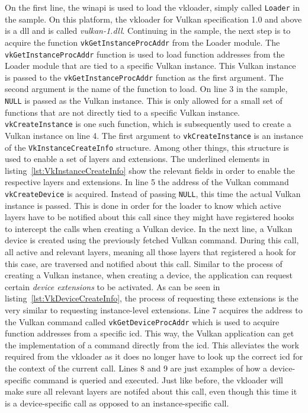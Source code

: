     On the first line, the \gls{winapi} is used to load the \gls{vkloader}, simply called \lstinline{Loader} in the sample. On this platform, the \gls{vkloader} for Vulkan specification 1.0 and above is a \gls{dll} and is called \textit{vulkan-1.dll}. Continuing in the sample, the next step is to acquire the function \lstinline{vkGetInstanceProcAddr} from the Loader module. The \lstinline{vkGetInstanceProcAddr} function is used to load function addresses from the Loader module that are tied to a specific Vulkan instance. This Vulkan instance is passed to the \lstinline{vkGetInstanceProcAddr} function as the first argument. The second argument is the name of the function to load. On line 3 in the sample, \lstinline{NULL} is passed as the Vulkan instance. This is only allowed for a small set of functions that are not directly tied to a specific Vulkan instance. \lstinline{vkCreateInstance} is one such function, which is subsequently used to create a Vulkan instance on line 4. The first argument to \lstinline{vkCreateInstance} is an instance of the \lstinline{VkInstanceCreateInfo} structure. Among other things, this structure is used to enable a set of layers and extensions. The underlined elements in listing~\ref{lst:VkInstanceCreateInfo} show the relevant fields in order to enable the respective layers and extensions. In line 5 the address of the Vulkan command \lstinline{vkCreateDevice} is acquired. Instead of passing \lstinline{NULL}, this time the actual Vulkan instance is passed. This is done in order for the loader to know which active layers have to be notified about this call since they might have registered hooks to intercept the calls when creating a Vulkan device. In the next line, a Vulkan device is created using the previously fetched Vulkan command. During this call, all active and relevant layers, meaning all those layers that registered a hook for this case, are traversed and notified about this call. Similar to the process of creating a Vulkan instance, when creating a device, the application can request certain \textit{device extensions} to be activated. As can be seen in listing~\ref{lst:VkDeviceCreateInfo}, the process of requesting these extensions is the very similar to requesting instance-level extensions. Line 7 acquires the address to the Vulkan command called \lstinline{vkGetDeviceProcAddr} which is used to acquire function addresses from a specific \gls{icd}. This way, the Vulkan application can get the implementation of a command directly from the \gls{icd}. This alleviates the work required from the \gls{vkloader} as it does no longer have to look up the correct \gls{icd} for the context of the current call. Lines 8 and 9 are just examples of how a device-specific command is queried and executed. Just like before, the \gls{vkloader} will make sure all relevant layers are notifed about this call, even though this time it is a device-specific call as opposed to an instance-specific call.

